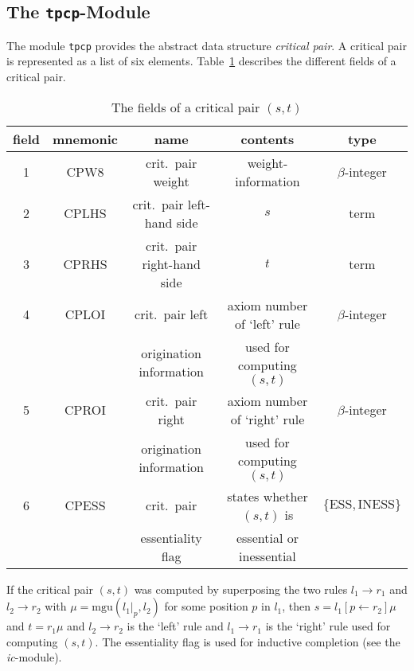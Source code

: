 \subsection{The {\tt tpcp}-Module}

The module {\tt tpcp} provides the abstract data structure {\em critical pair}.
A critical pair is represented as a list of six elements.
Table~\ref{ta:cp} describes the different fields of a critical pair.
\begin{table}
\begin{center}
\begin{tabular}{|c|c|c|c|c|}
 \hline
 field  & mnemonic & name & contents & type \\
 \hline\hline
 1 &  CPW8 & crit.\ pair weight & weight-information & $\beta$-integer \\
 \hline
 2 &  CPLHS & crit.\ pair left-hand side & $s$ & term \\
 \hline
 3 & CPRHS & crit.\ pair right-hand side & $t$ & term \\
 \hline
 4 & CPLOI & crit.\ pair left & axiom number of `left' rule & $\beta$-integer \\
   &       & origination information & used for computing $(s,t)$ & \\
 \hline
 5 & CPROI & crit.\ pair right & axiom number of `right' rule& $\beta$-integer\\
   &       & origination information    & used for computing $(s,t)$ & \\
 \hline
 6 & CPESS & crit.\ pair & states whether $(s,t)$ is & $\{ \mbox{ESS}, 
                                                           \mbox{INESS} \}$ \\
   &       & essentiality flag & essential or inessential & \\
 \hline
\end{tabular}
\caption{The fields of a critical pair $(s,t)$} \label{ta:cp}
\end{center}
\end{table}
If the critical pair $(s,t)$ was computed by superposing the two rules
\( l_1 \rightarrow r_1 \) and \( l_2 \rightarrow r_2 \) with
\( \mu =\mbox{mgu}(l_1|_p,l_2) \) for some position $p$ in $l_1$,
then \( s = l_1[p \leftarrow r_2]\mu \) and \( t = r_1\mu \) and
\( l_2 \rightarrow r_2 \) is the `left' rule  and
\( l_1 \rightarrow r_1 \) is the `right' rule used for computing $(s,t)$.
The essentiality flag is used for inductive completion
(see the {\it ic}-module).

